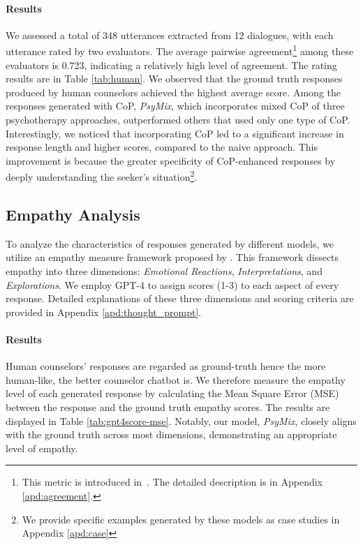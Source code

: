 \paragraph{Results}
We assessed a total of 348 utterances extracted from 12 dialogues, with each utterance rated by two evaluators. The average pairwise agreement\footnote{This metric is introduced in~\citet{liu2023alignbench}. The detailed description is in Appendix \ref{apd:agreement}.} among these evaluators is 0.723, indicating a relatively high level of agreement. The rating results are in Table \ref{tab:human}. 
We observed that the ground truth responses produced by human counselors achieved the highest average score. Among the responses generated with CoP, \textit{PsyMix}, which incorporates mixed CoP of three psychotherapy approaches, outperformed others that used only one type of CoP. Interestingly, we noticed that incorporating CoP led to a significant increase in response length and higher scores, compared to the naive approach. This improvement is because the greater specificity of CoP-enhanced responses by deeply understanding the seeker's situation\footnote{We provide specific examples generated by these models as case studies in Appendix \ref{apd:case}}.

\subsection{Empathy Analysis}
\label{sec:empathy}
To analyze the characteristics of responses generated by different models, we utilize an empathy measure framework proposed by \citet{sharma-etal-2020-computational}. This framework dissects empathy into three dimensions: \textit{Emotional Reactions}, \textit{Interpretations}, and \textit{Explorations}. We employ GPT-4 to assign scores (1-3) to each aspect of every response. Detailed explanations of these three dimensions and scoring criteria are provided in Appendix \ref{apd:thought_prompt}.
\paragraph{Results} %
Human counselors' responses are regarded as ground-truth hence the more human-like, the better counselor chatbot is.
We therefore measure the empathy level of each generated response by calculating the Mean Square Error (MSE) between the response and the ground truth empathy scores. The results are displayed in Table \ref{tab:gpt4score-mse}. 
Notably, our model, \textit{PsyMix}, closely aligns with the ground truth across most dimensions, demonstrating an appropriate level of empathy.

